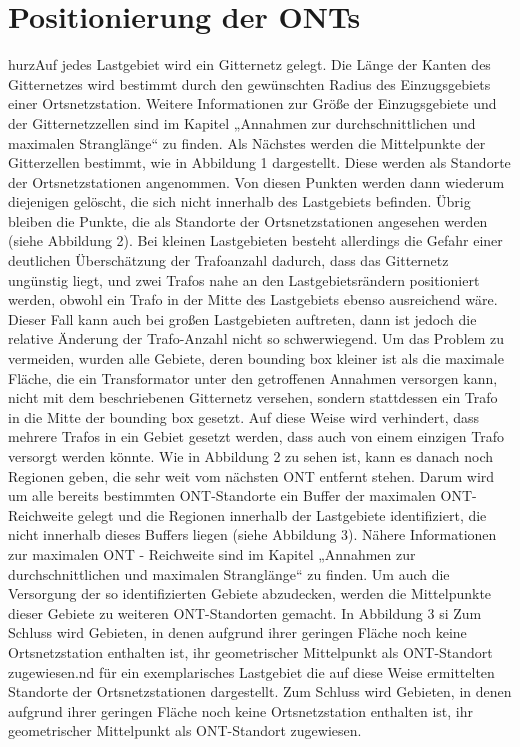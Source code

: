\documentclass[11pt]{scrreprt}
\begin{document}
\chapter{Positionierung der ONTs}
\label{sec:Positionierung der ONTs}

hurzAuf jedes Lastgebiet wird ein Gitternetz gelegt. Die Länge der Kanten des Gitternetzes wird bestimmt durch den gewünschten Radius des Einzugsgebiets einer Ortsnetzstation. Weitere Informationen zur Größe der Einzugsgebiete und der Gitternetzzellen sind im Kapitel  „Annahmen zur durchschnittlichen und maximalen Stranglänge“  zu finden. Als Nächstes werden die Mittelpunkte der Gitterzellen bestimmt, wie in Abbildung 1 dargestellt. Diese werden als Standorte der Ortsnetzstationen angenommen. Von diesen Punkten werden dann wiederum diejenigen gelöscht, die sich nicht innerhalb des Lastgebiets befinden. Übrig bleiben die Punkte, die als Standorte der Ortsnetzstationen angesehen werden (siehe Abbildung 2).
Bei kleinen Lastgebieten besteht allerdings die Gefahr einer deutlichen Überschätzung der Trafoanzahl dadurch, dass das Gitternetz ungünstig liegt, und zwei Trafos nahe an den Lastgebietsrändern positioniert werden, obwohl ein Trafo in der Mitte des Lastgebiets ebenso ausreichend wäre. Dieser Fall kann auch bei großen Lastgebieten auftreten, dann ist jedoch die relative Änderung der Trafo-Anzahl nicht so schwerwiegend. Um das Problem zu vermeiden, wurden alle Gebiete, deren bounding box kleiner ist als die maximale Fläche, die ein Transformator unter den getroffenen Annahmen versorgen kann, nicht mit dem beschriebenen Gitternetz versehen, sondern stattdessen ein Trafo in die Mitte der bounding box gesetzt. Auf diese Weise wird verhindert, dass mehrere Trafos in ein Gebiet gesetzt werden, dass auch von einem einzigen Trafo versorgt werden könnte. Wie in Abbildung 2 zu sehen ist, kann es danach noch Regionen geben, die sehr weit vom nächsten ONT entfernt stehen. Darum wird um alle bereits bestimmten ONT-Standorte ein Buffer der maximalen ONT-Reichweite gelegt und die Regionen innerhalb der Lastgebiete identifiziert, die nicht innerhalb dieses Buffers liegen (siehe Abbildung 3). Nähere Informationen zur maximalen ONT - Reichweite sind im Kapitel „Annahmen zur durchschnittlichen und maximalen Stranglänge“ zu finden. Um auch die Versorgung der so identifizierten Gebiete abzudecken, werden die Mittelpunkte dieser Gebiete zu weiteren ONT-Standorten gemacht. In Abbildung 3 si Zum Schluss wird Gebieten, in denen aufgrund ihrer geringen Fläche noch keine Ortsnetzstation enthalten ist, ihr geometrischer Mittelpunkt als ONT-Standort zugewiesen.nd für ein exemplarisches Lastgebiet die auf diese Weise ermittelten Standorte der Ortsnetzstationen dargestellt. Zum Schluss wird Gebieten, in denen aufgrund ihrer geringen Fläche noch keine Ortsnetzstation enthalten ist, ihr geometrischer Mittelpunkt als ONT-Standort zugewiesen.
\end{document}
